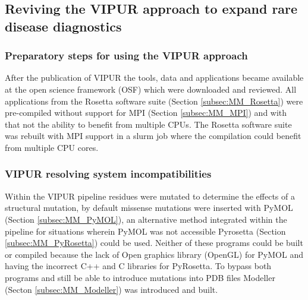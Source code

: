 \subsection{Reviving the VIPUR approach to expand rare disease diagnostics}
	\subsubsection{Preparatory steps for using the VIPUR approach}
		After the publication of VIPUR the tools, data and applications became available at the open science framework (OSF) \cite{baugh_vipur:_2015} which were downloaded and reviewed. All applications from the Rosetta software suite (Section \ref{subsec:MM_Rosetta}) were pre-compiled without support for MPI (Section \ref{subsec:MM_MPI}) and with that not the ability to benefit from multiple CPUs. The Rosetta software suite was rebuilt with MPI support in a slurm job where the compilation could benefit from multiple CPU cores.
	\label{subsubsec:RES_Prepare}
	
	\subsubsection{VIPUR resolving system incompatibilities}
	Within the VIPUR pipeline residues were mutated to determine the effects of a structural mutation, by default missense mutations were inserted with PyMOL (Section \ref{subsec:MM_PyMOL}), an alternative method integrated within the pipeline for situations wherein PyMOL was not accessible Pyrosetta (Section \ref{subsec:MM_PyRosetta}) could be used. Neither of these programs could be built or compiled because the lack of Open graphics library (OpenGL) for PyMOL and having the incorrect C++ and C libraries for PyRosetta. To bypass both programs and still be able to introduce mutations into PDB files Modeller (Secton \ref{subsec:MM_Modeller}) was introduced and built.
	
